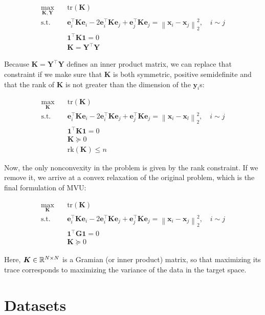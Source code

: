 \documentclass{article} %
\newcommand{\norm}[1]{\left\lVert#1\right\rVert}
\begin{document}
\begin{align}
\max_{\bm{K},\bm{Y}} \quad & \text{tr}(\bm{K})\\
\textrm{s.t.} \quad & \bm{e}_{i}^{\top}\bm{K}\bm{e}_{i} - 2 \bm{e}_{i}^{\top}\bm{K}\bm{e}_{j} + \bm{e}_{j}^{\top}\bm{K}\bm{e}_{j} =\norm{\bm{x}_{i}-\bm{x}_{j}}_{2}^{2},\quad i\sim j\\
\quad & \bm{1}^{\top}\bm{K}\bm{1} = 0\\
\quad & \bm{K} = \bm{Y}^{\top}\bm{Y}
\end{align}

Because $\bm{K}=\bm{Y}^{\top}\bm{Y}$ defines an inner product matrix, we can replace that constraint if we make sure that $\bm{K}$ is both symmetric, positive semidefinite and that the rank of $\bm{K}$ is not greater than the dimension of the $\bm{y}_i$s:

\begin{align}
\max_{\bm{K}} \quad & \text{tr}(\bm{K})\\
\textrm{s.t.} \quad & \bm{e}_{i}^{\top}\bm{K}\bm{e}_{i} - 2 \bm{e}_{i}^{\top}\bm{K}\bm{e}_{j} + \bm{e}_{j}^{\top}\bm{K}\bm{e}_{j} =\norm{\bm{x}_{i}-\bm{x}_{l}}_{2}^{2},\quad i\sim j\\
\quad & \bm{1}^{\top}\bm{K}\bm{1} = 0\\
\quad & \bm{K}\succeq 0\\
\quad & \text{rk}(\bm{K}) \leq n
\end{align}

Now, the only nonconvexity in the problem is given by the rank constraint. If we remove it, we arrive at a convex relaxation of the original problem, which is the final formulation of MVU:

\begin{align}
\max_{\bm{K}} \quad & \text{tr}(\bm{K})\\
\textrm{s.t.} \quad & \bm{e}_{i}^{\top}\bm{K}\bm{e}_{i} - 2 \bm{e}_{i}^{\top}\bm{K}\bm{e}_{j} + \bm{e}_{j}^{\top}\bm{K}\bm{e}_{j} =\norm{\bm{x}_{i}-\bm{x}_{j}}_{2}^{2},\quad i\sim j\\
\quad & \bm{1}^{\top}\bm{G}\bm{1} = 0\\
\quad & \bm{K}\succeq 0
\end{align}

Here, $\bm{K}\in\mathbb{R}^{N\times N}$ is a Gramian (or inner product) matrix, so that maximizing its trace corresponds to maximizing the variance of the data in the target space.

\section{Datasets}\label{app:datasets}
\end{document}
